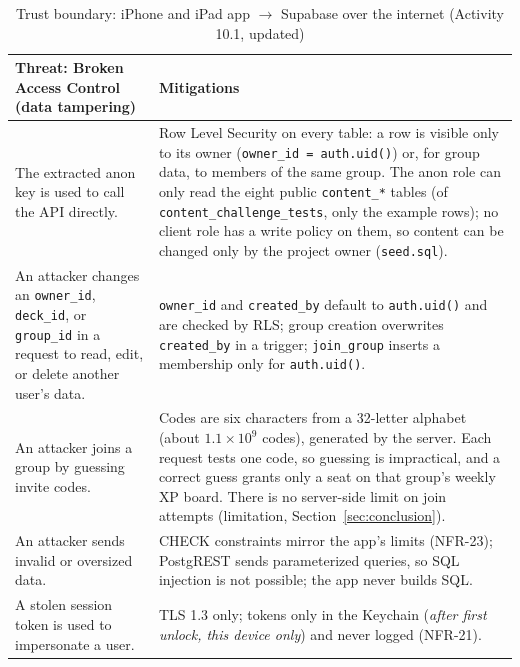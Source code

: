 \documentclass[12pt,letterpaper]{article}
\begin{document}
\begin{table}[H]
\centering
\caption{Trust boundary: iPhone and iPad app $\to$ Supabase over the internet (Activity 10.1, updated)}
\label{tab:boundary}
\begin{tabularx}{\textwidth}{@{}Y Y@{}}
\toprule
\textbf{Threat: Broken Access Control (data tampering)} & \textbf{Mitigations} \\
\midrule
The extracted anon key is used to call the API directly. & Row Level Security on every table: a row is visible only to its owner (\texttt{owner\_id = auth.uid()}) or, for group data, to members of the same group. The anon role can only read the eight public \texttt{content\_*} tables (of \texttt{content\_challenge\_tests}, only the example rows); no client role has a write policy on them, so content can be changed only by the project owner (\texttt{seed.sql}). \\
An attacker changes an \texttt{owner\_id}, \texttt{deck\_id}, or \texttt{group\_id} in a request to read, edit, or delete another user's data. & \texttt{owner\_id} and \texttt{created\_by} default to \texttt{auth.uid()} and are checked by RLS; group creation overwrites \texttt{created\_by} in a trigger; \texttt{join\_group} inserts a membership only for \texttt{auth.uid()}. \\
An attacker joins a group by guessing invite codes. & Codes are six characters from a 32-letter alphabet (about $1.1 \times 10^9$ codes), generated by the server. Each request tests one code, so guessing is impractical, and a correct guess grants only a seat on that group's weekly XP board. There is no server-side limit on join attempts (limitation, Section~\ref{sec:conclusion}). \\
An attacker sends invalid or oversized data. & CHECK constraints mirror the app's limits (NFR-23); PostgREST sends parameterized queries, so SQL injection is not possible; the app never builds SQL. \\
A stolen session token is used to impersonate a user. & TLS 1.3 only; tokens only in the Keychain (\emph{after first unlock, this device only}) and never logged (NFR-21). \\
\bottomrule
\end{tabularx}
\end{table}
\end{document}

